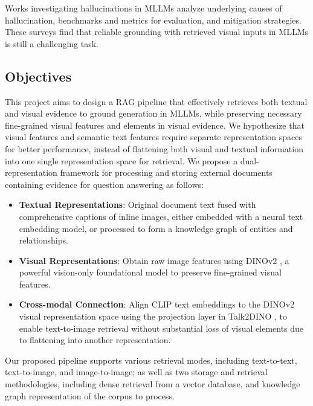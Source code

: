 Works investigating hallucinations in MLLMs \cite{bai2025hallucinationmultimodallargelanguage,xia2025rethinking,leng2025the}
analyze underlying causes of hallucination, benchmarks and metrics for evaluation, and mitigation strategies.
These surveys find that reliable grounding with retrieved visual inputs in MLLMs is still a challenging task.


\subsection{Objectives}

This project aims to design a RAG pipeline that effectively retrieves both textual and visual evidence to ground generation in MLLMs,
while preserving necessary fine-grained visual features and elements in visual evidence.
We hypothesize that visual features and semantic text features require separate representation spaces for better performance,
instead of flattening both visual and textual information into one single representation space for retrieval.
We propose a dual-representation framework for processing and storing external documents containing evidence for question answering as follows:

\begin{itemize}
    \item \textbf{Textual Representations}: 
        Original document text fused with comprehensive captions of inline images, either embedded with a neural text embedding model,
        or processed to form a knowledge graph of entities and relationships.

    \item \textbf{Visual Representations}:
        Obtain raw image features using DINOv2 \cite{oquab2024dinov2learningrobustvisual}, 
        a powerful vision-only foundational model to preserve fine-grained visual features.

    \item \textbf{Cross-modal Connection}: 
        Align CLIP text embeddings to the DINOv2 visual representation space using the projection layer in Talk2DINO \cite{Barsellotti_2025_ICCV},
        to enable text-to-image retrieval without substantial loss of visual elements due to flattening into another representation.
\end{itemize}

Our proposed pipeline supports various retrieval modes, including text-to-text, text-to-image, and image-to-image;
as well as two storage and retrieval methodologies, including dense retrieval from a vector database, and knowledge graph representation of the corpus to process.

